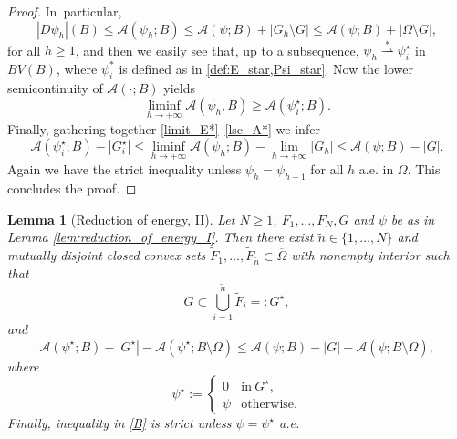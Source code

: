 \documentclass[JEP,XML,SOM,Unicode, NoFloatCountersInSection,published]{cedram}
\let\Om\Omega
\newcommand{\weakstar}{\stackrel{*}{\rightharpoonup}}
\newtheorem{lemma}[theorem]{Lemma}
\theoremstyle{definition}
\begin{document}
\begin{proof}
In~particular,
\begin{equation*}
|D\psi_{h}|(B)\le\mathcal{A}(\psi_{h};B)\le \mathcal{A}(\psi;B)+|G_{h}\setminus G|\le \mathcal{A}(\psi;B)+|\Om\setminus G|,
\end{equation*}
for all $h\ge1$, and then we easily see that, up to a subsequence, $\psi_{h}\weakstar\psi^\star_i$ in $BV(B)$, where $\psi_i^*$ is defined as in \eqref{def:E_star,Psi_star}.
Now the lower semicontinuity of $\mathcal{A}(\cdot;B)$ yields
\begin{equation}\label{lsc_A*}
\liminf_{h\to+\infty}\mathcal{A}(\psi_{h},B)\ge
\mathcal{A}(\psi_i^\star;B).
\end{equation}
Finally, gathering together \eqref{limit_E*}--\eqref{lsc_A*} we infer
\begin{equation*}
\mathcal{A}(\psi_i^\star;B)-|G^\star_i|\le
\liminf_{h\to+\infty}\mathcal{A}(\psi_{h};B)-\lim_{h\to+\infty}|G_{h}|\le
\mathcal{A}(\psi;B)-|G|.
\end{equation*}
Again we have the strict inequality unless $\psi_h=\psi_{h-1}$ for all $h$ a.e. in $\Om$.
This concludes the proof.
\end{proof}

\begin{lemma}[Reduction of energy, II]
\label{lem:reduction_of_energy_II}
Let $N\ge 1$, $F_1,\dots,F_N,G$ and $\psi$ be
as in Lemma \ref{lem:reduction_of_energy_I}.
Then there exist $\tilde n \in \{1, \dots, N\}$ and mutually disjoint closed convex sets $\widetilde F_1,\dots,\widetilde F_{\tilde n}\subset\overline\Om$ with nonempty interior
such that
\begin{equation}\label{A}
G\subset \bigcup_{i=1}^{\tilde n}\widetilde F_i=:G^\star,
\end{equation}
and
\begin{equation}\label{B}
\mathcal{A}(\psi^\star;B)-|G^\star|-\mathcal{A}(\psi^\star;B\setminus \overline\Om)\le \mathcal A(\psi; B)-|G|-\mathcal{A}(\psi;B\setminus\overline{\Om}),
\end{equation}
where
\begin{equation}\label{C}
\psi^\star:=\begin{cases}
0&\text{in}\ G^\star,\\
\psi&\text{otherwise}.
\end{cases}
\end{equation}
Finally, inequality in \eqref{B} is strict unless $\psi=\psi^\star$ a.e.
\end{lemma}
\end{document}
